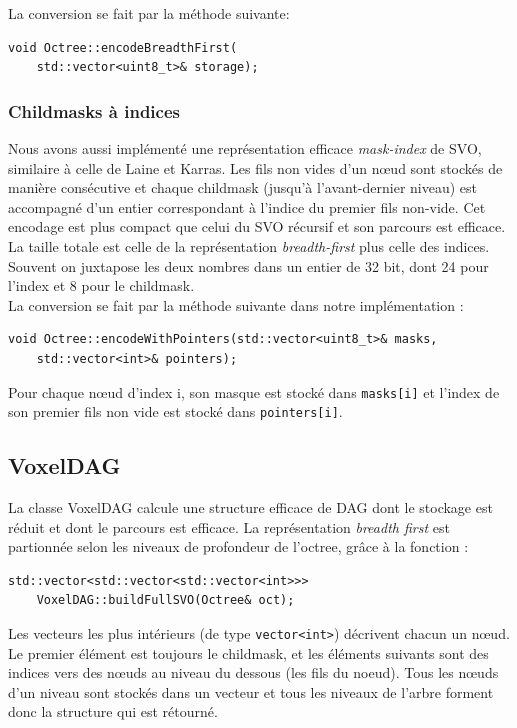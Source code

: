 \documentclass[a4paper]{article}
\begin{document}
La conversion se fait par la méthode suivante:
\begin{lstlisting}
void Octree::encodeBreadthFirst(
	std::vector<uint8_t>& storage);
\end{lstlisting}


\subsubsection{Childmasks à indices} %

Nous avons aussi implémenté une représentation efficace \textit{mask-index} de SVO, similaire à celle de Laine et Karras. Les fils non vides d'un nœud sont stockés de manière consécutive et chaque childmask (jusqu'à l'avant-dernier niveau) est accompagné d'un entier correspondant à l'indice du premier fils non-vide. Cet encodage est plus compact que celui du SVO récursif et son parcours est efficace. La taille totale est celle de la représentation \textit{breadth-first} plus celle des indices. Souvent on juxtapose les deux nombres dans un entier de 32 bit, dont 24 pour l'index et 8 pour le childmask. \\

La conversion se fait par la méthode suivante dans notre implémentation :
\begin{lstlisting}
void Octree::encodeWithPointers(std::vector<uint8_t>& masks, 
	std::vector<int>& pointers);
\end{lstlisting}

Pour chaque nœud d'index i, son masque est stocké dans \texttt{masks[i]} et l’index de son premier fils non vide est stocké dans \texttt{pointers[i]}.



\subsection{VoxelDAG} %
La classe VoxelDAG calcule une structure efficace de DAG dont le stockage est réduit et dont le parcours est efficace. La représentation \textit{breadth first} est partionnée selon les niveaux de profondeur de l'octree, grâce à la fonction :
\begin{lstlisting}
std::vector<std::vector<std::vector<int>>> 
	VoxelDAG::buildFullSVO(Octree& oct);
\end{lstlisting}

Les vecteurs les plus intérieurs (de type \texttt{vector<int>}) décrivent chacun un nœud. Le premier élément est toujours le childmask, et les éléments suivants sont des indices vers des nœuds au niveau du dessous (les fils du noeud). Tous les nœuds d'un niveau sont stockés dans un vecteur et tous les niveaux de l'arbre forment donc la structure qui est rétourné. \\
\end{document}

